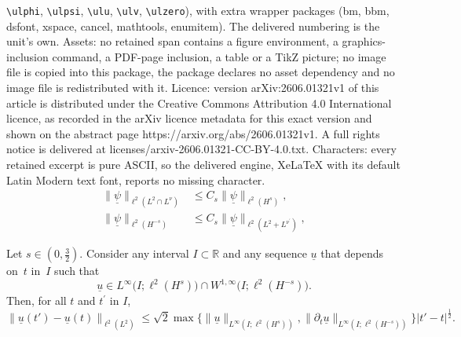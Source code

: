 \documentclass[10pt,a4paper]{amsart}
\newcommand{\ulpsi}{\underline{\psi}}
\newcommand{\ulu}{\underline{u}}
\begin{document}
\texttt{\textbackslash ulphi}, \texttt{\textbackslash ulpsi}, \texttt{\textbackslash ulu}, \texttt{\textbackslash ulv}, \texttt{\textbackslash ulzero}), with extra wrapper packages (bm, bbm, dsfont, xspace, cancel, mathtools, enumitem). The delivered numbering is the unit's own. Assets: no retained span contains a figure environment, a graphics-inclusion command, a PDF-page inclusion, a table or a TikZ picture; no image file is copied into this package, the package declares no asset dependency and no image file is redistributed with it. Licence: version arXiv:2606.01321v1 of this article is distributed under the Creative Commons Attribution 4.0 International licence, as recorded in the arXiv licence metadata for this exact version and shown on the abstract page https://arxiv.org/abs/2606.01321v1. A full rights notice is delivered at licenses/arxiv-2606.01321-CC-BY-4.0.txt. Characters: every retained excerpt is pure ASCII, so the delivered engine, XeLaTeX with its default Latin Modern text font, reports no missing character.
	\begin{align}
		\label{eq:sobolev_embedding_plus}
		\| \ulpsi \|_{ \ell^2(L^2\cap L^\nu)} &\leq  C_{s} \| \ulpsi \|_{ \ell^2(H^{s})}, \\
		\label{eq:sobolev_embedding_minus}
		\| \ulpsi \|_{ \ell^2(H^{-s})} &\leq  C_{s} \| \ulpsi \|_{ \ell^2(L^2+ L^{\nu^\prime})},
	\end{align}

	\begin{lemma}\label{lem:estimate_holder_t}
		Let $s\in(0,\frac32)$. Consider any interval $ I \subset \mathbb{R} $ and any sequence $\ulu $ that depends on~$t$ in~$I$ such that
		$${\ulu} \in L^\infty\big(I; \ell^2(H^{s})\big) \cap W^{1,\infty} \big(I; \ell^2(H^{-s})\big). $$ Then, for all $t$ and $t^\prime$ in $I$, 
		\begin{equation}\label{est:holder_time}
			\| {\ulu}(t') -  {\ulu}(t) \|_{\ell^2(L^{2})} 
			\leq  \sqrt{2} \max\big\{ \|{\ulu}\|_{L^\infty(I;\ell^2(H^{s}))} , \| \partial_t {\ulu}\|_{L^\infty(I;\ell^2(H^{-s}))} \big\}  |t'-t|^{\frac{1}{2}} .
		\end{equation}
	\end{lemma}
\end{document}
